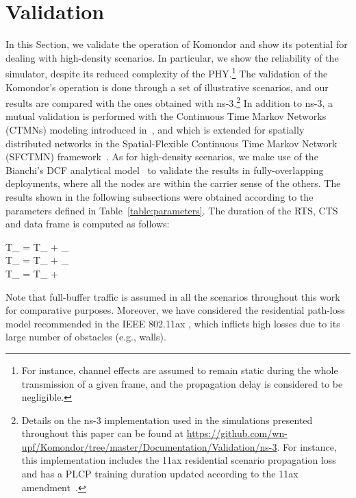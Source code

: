 \documentclass{article}
\DeclarePairedDelimiter{\ceil}{\lceil}{\rceil}
\begin{document}
	\section{Validation}
	\label{section:validations}
	In this Section, we validate the operation of Komondor and show its potential for dealing with high-density scenarios. In particular, we show the reliability of the simulator, despite its reduced complexity of the PHY.\footnote[4]{For instance, channel effects are assumed to remain static during the whole transmission of a given frame, and the propagation delay is considered to be negligible.} The validation of the Komondor's operation is done through a set of illustrative scenarios, and our results are compared with the ones obtained with ns-3.\footnote[5]{Details on the ns-3 implementation used in the simulations presented throughout this paper can be found at \url{https://github.com/wn-upf/Komondor/tree/master/Documentation/Validation/ns-3}. For instance, this implementation includes the 11ax residential scenario propagation loss~\cite{pathloss11ax} and has a PLCP training duration updated according to the 11ax amendment~\cite{tgax2017draft}.} In addition to ns-3, a mutual validation is performed with the Continuous Time Markov Networks (CTMNs) modeling introduced in~\cite{bellalta2014throughput}, and which is extended for spatially distributed networks in the Spatial-Flexible Continuous Time Markov Network (SFCTMN) framework~\cite{barrachina2019dynamic}. As for high-density scenarios, we make use of the Bianchi's DCF analytical model~\cite{bianchi2000performance} to validate the results in fully-overlapping deployments, where all the nodes are within the carrier sense of the others. The results shown in the following subsections were obtained according to the parameters defined in Table~\ref{table:parameters}. The duration of the RTS, CTS and data frame is computed as follows:
	
	\begin{flalign*}
	T_ = T_{} +  \sigma_  \text{,} \\
	T_ = T_{} +  \sigma_ \text{,} \\
	T_ = T_{} +  \sigma {}
	\end{flalign*}
	
	Note that full-buffer traffic is assumed in all the scenarios throughout this work for comparative purposes. Moreover, we have considered the residential path-loss model recommended in the IEEE 802.11ax \cite{pathloss11ax}, which inflicts high losses due to its large number of obstacles (e.g., walls).
	
\end{document}
